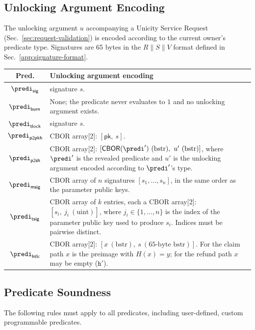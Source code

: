 \subsection{Unlocking Argument Encoding}

The unlocking argument $u$ accompanying a Unicity Service Request (Sec.~\ref{sec:request-validation}) is encoded according to the current owner's predicate type. Signatures are 65 bytes in the $R\|S\|V$ format defined in Sec.~\ref{app:signature-format}.

\begin{longtable}{cp{10cm}}
\textbf{Pred.} & \textbf{Unlocking argument encoding} \\
\hline
\endhead
$\predi_\mathsf{sig}$    & signature $s$. \\
$\predi_\mathsf{burn}$   & None; the predicate never evaluates to $1$ and no unlocking argument exists. \\
$\predi_\mathsf{tlock}$  & signature $s$. \\
$\predi_\mathsf{p2pkh}$  & CBOR array[2]: $[\mathsf{pk},\ s]$. \\
$\predi_\mathsf{p2sh}$   & CBOR array[2]: $[\mathsf{CBOR}(\predi')\ (\text{bstr}),\ u'\ (\text{bstr})]$, where $\predi'$ is the revealed predicate and $u'$ is the unlocking argument encoded according to $\predi'$'s type. \\
$\predi_\mathsf{msig}$   & CBOR array of $n$ signatures $[s_1, \ldots, s_n]$, in the same order as the parameter public keys. \\
$\predi_\mathsf{tsig}$   & CBOR array of $k$ entries, each a CBOR array[2]: $[s_i,\ j_i\ (\text{uint})]$, where $j_i \in \{1,\ldots,n\}$ is the index of the parameter public key used to produce $s_i$. Indices must be pairwise distinct. \\
$\predi_\mathsf{htlc}$   & CBOR array[2]: $[x\ (\text{bstr}),\ s\ (65\text{-byte bstr})]$. For the claim path $x$ is the preimage with $H(x) = y$; for the refund path $x$ may be empty ($\mathtt{h'}$). \\
\end{longtable}


\subsection{Predicate Soundness}\label{app:predicate-soundness}

The following rules must apply to all predicates, including user-defined, custom programmable predicates.


